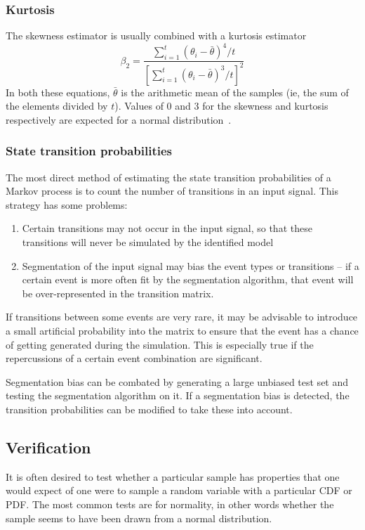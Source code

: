 \subsubsection{Kurtosis}
The skewness estimator is usually combined with a kurtosis estimator 
\begin{equation} 
  \beta_2 =
  \frac{\displaystyle\sum_{i=1}^t \left ( \theta_i - \bar{\theta} \right
    )^4/t} { \left [ \displaystyle\sum_{i=1}^t \left(
        \theta_i-\bar{\theta} \right)^3/t \right]^2} 
\end{equation}
%
In both these equations, $\bar{\theta}$ is the arithmetic mean of the samples (ie, the sum of the elements divided by $t$).  
Values of 0 and 3 for the skewness and kurtosis respectively are expected for a normal distribution~\citep{kleijnen1975statistical}.

\subsubsection{State transition probabilities}
The most direct method of estimating the state transition probabilities of a Markov process is to count the number of transitions in an input signal.
This strategy has some problems:
\begin{enumerate}
\item Certain transitions may not occur in the input signal, so that these transitions will never be simulated by the identified model
\item Segmentation of the input signal may bias the event types or transitions -- if a certain event is more often fit by the segmentation algorithm, that event will be over-represented in the transition matrix.
\end{enumerate}

If transitions between some events are very rare, it may be advisable to introduce a small artificial probability into the matrix to ensure that the event has a chance of  getting generated during the simulation.
This is especially true if the repercussions of a certain event combination are significant.  

Segmentation bias can be combated by generating a large unbiased test set and testing the segmentation algorithm on it.
If a segmentation bias is detected, the transition probabilities can be modified to take these into account.

\subsection{Verification}
It is often desired to test whether a particular sample has properties that one would expect of one were to sample a random variable with a particular CDF or PDF.
The most common tests are for normality, in other words whether the sample seems to have been drawn from a normal distribution.

